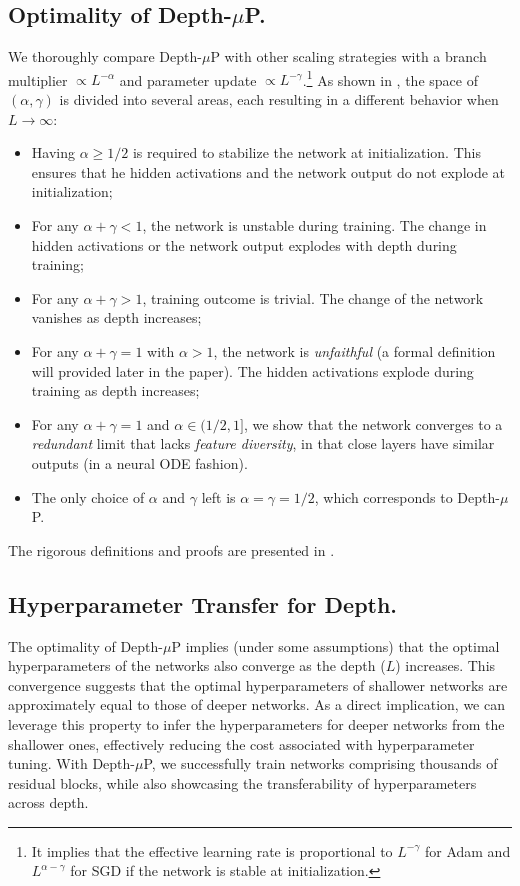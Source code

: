 \documentclass{article}
\theoremstyle{plain}
\theoremstyle{definition}
\begin{document}
\subsection{Optimality of Depth-$\mu$P. } 

We thoroughly compare Depth-$\mu$P with other scaling strategies with a branch multiplier $\propto L^{-\alpha}$ and parameter update  $\propto L^{-\gamma}$.\footnote{It implies that the effective learning rate is proportional to $L^{-\gamma}$ for Adam and $L^{\alpha-\gamma}$ for SGD if the network is stable at initialization.}  As shown in , the space of $(\alpha, \gamma)$ is divided into several areas, each resulting in a different behavior when $L\to \infty$: 
\begin{itemize}[leftmargin=*]
    \item Having $\alpha\geq 1/2$ is required to stabilize the network at initialization. This ensures that he hidden activations and the network output do not explode at initialization;
    \item For any $\alpha+\gamma < 1$, the network is unstable during training. The change in hidden activations or the network output explodes with depth during training;
    \item For any $\alpha+\gamma > 1$, training outcome is trivial. The change of the network vanishes as depth increases;
\end{itemize}

\begin{itemize}[leftmargin=*]
    \item For any $\alpha+\gamma=1$ with $\alpha > 1$, the network is \emph{unfaithful} (a formal definition will provided later in the paper). The hidden activations explode during training as depth increases;
    \item For any $\alpha + \gamma = 1$ and $\alpha \in (1/2, 1]$, we show that the network converges to a \emph{redundant} limit that lacks \emph{feature diversity}, in that close layers have similar outputs (in a neural ODE fashion). 
    \item The only choice of $\alpha$ and $\gamma$ left is $\alpha = \gamma = 1/2$, which corresponds to Depth-$\mu$P.
\end{itemize}
The rigorous definitions and proofs are presented in . 

\subsection{Hyperparameter Transfer for Depth.} 
The optimality of Depth-$\mu$P implies (under some assumptions) that the optimal hyperparameters of the networks also converge as the depth ($L$) increases.
This convergence suggests that the optimal hyperparameters of shallower networks are approximately equal to those of deeper networks. As a direct implication, we can leverage this property to infer the hyperparameters for deeper networks from the shallower ones, effectively reducing the cost associated with hyperparameter tuning. With Depth-$\mu$P, we successfully train networks comprising thousands of residual blocks, while also showcasing the transferability of hyperparameters across depth.
\end{document}
